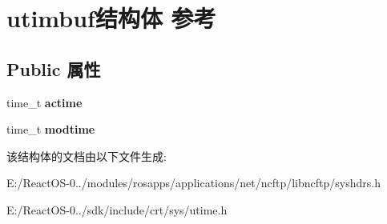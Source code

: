 \hypertarget{structutimbuf}{}\section{utimbuf结构体 参考}
\label{structutimbuf}
\subsection*{Public 属性}
\begin{DoxyCompactItemize}
\item 
\mbox{\label{structutimbuf_aa39cf0bad7eff4df6239528506a557df}} 
time\+\_\+t {\bfseries actime}
\item 
\mbox{\label{structutimbuf_a7588ffe699a9eda52e94aa593bf7d6d8}} 
time\+\_\+t {\bfseries modtime}
\end{DoxyCompactItemize}


该结构体的文档由以下文件生成\+:\begin{DoxyCompactItemize}
\item 
E\+:/\+React\+O\+S-\/0../modules/rosapps/applications/net/ncftp/libncftp/syshdrs.\+h\item 
E\+:/\+React\+O\+S-\/0../sdk/include/crt/sys/utime.\+h\end{DoxyCompactItemize}
